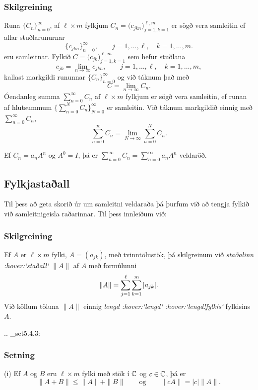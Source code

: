 \subsubsection{Skilgreining}  Runa $\{C_n\}_{n=0}^\infty$,  af
$\ell\times m$ fylkjum $C_n=\big(c_{jkn}\big)_{j=1,k=1}^{\ell, m}$
er sögð vera samleitin ef allar stuðlarunurnar
 $$\{c_{jkn}\}_{n=0}^\infty, \qquad j=1,\dots,\ell, \quad k=1,\dots, m.
 $$
eru samleitnar.  Fylkið $C=\big(c_{jk}\big)_{j=1,k=1}^{\ell, m}$ sem
hefur stuðlana
 $$c_{jk}=\lim\limits_{n\to\infty}c_{jkn}, \qquad j=1,\dots,\ell, \quad
k=1,\dots, m,
 $$
kallast markgildi rununnar $\{C_n\}_{n=0}^\infty$ og við táknum það
með
 $$C=\lim\limits_{n\to \infty}C_n.
 $$
Óendanleg summa $\sum_{n=0}^\infty C_n$ af $\ell\times m$ fylkjum er
sögð vera samleitin, ef runan af hlutsummum  $\{\sum_{n=0}^N
C_n\}_{N=0}^\infty$  er samleitin.  Við táknum markgildið einnig með
$\sum_{n=0}^\infty C_n$,
 $$\sum_{n=0}^\infty C_n= \lim\limits_{N\to \infty}
\sum_{n=0}^N C_n.
 $$


Ef $C_n=a_n A^n$ og $A^0=I$, þá er 
$\sum_{n=0}^\infty C_n=\sum_{n=0}^\infty a_nA^n$ 
veldaröð.  


\subsection*{Fylkjastaðall}

Til þess að geta
skorið úr um samleitni veldaraða þá þurfum við að tengja fylkið við
samleitnigeisla raðarinnar.  Til þess innleiðum við:

\subsubsection{Skilgreining}  Ef $A$ er $\ell\times m$ fylki, $A=(a_{jk})$,
með tvinntölustök, þá skilgreinum við {\it staðalinn :hover:`staðall`} $\|A\|$ af $A$ með
formúlunni 
 $$\|A\|=\sum_{j=1}\sp \ell \sum_{k=1}\sp m |a_{jk}|.
 $$
Við köllum töluna $\|A\|$ einnig {\it
lengd :hover:`lengd` :hover:`lengd!fylkis`} fylkisins $A$.



.. _set5.4.3:

\subsubsection{Setning}  (i) Ef $A$ og $B$ eru
$\ell\times m$ fylki með stök í ${\mathbb C}$ og $c\in {\mathbb C}$, þá er
 $$\|A+B\|\leq \|A\|+\|B\| \qquad \text{og} \qquad
\|cA\|=|c|\|A\|.
 $$


